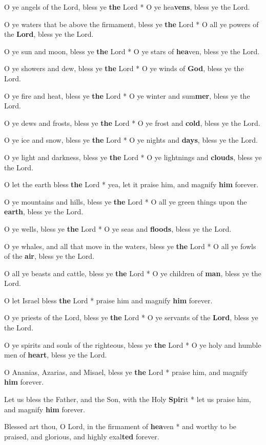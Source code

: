 \begin{multicols}{2}
	O ye angels of the Lord, bless ye \textbf{the} Lord * O ye hea\textbf{vens}, bless ye the Lord.
	
	O ye waters that be above the firmament, bless ye \textbf{the} Lord * O all ye powers of the \textbf{Lord}, bless ye the Lord.
	
	O ye sun and moon, bless ye \textbf{the} Lord * O ye stars of \textbf{hea}ven, bless ye the Lord.
	
	O ye showers and dew, bless ye \textbf{the} Lord * O ye winds of \textbf{God}, bless ye the Lord.
	
	O ye fire and heat, bless ye \textbf{the} Lord * O ye winter and sum\textbf{mer}, bless ye the Lord.
	
	O ye dews and frosts, bless ye \textbf{the} Lord * O ye frost and \textbf{cold}, bless ye the Lord.
	
	O ye ice and snow, bless ye \textbf{the} Lord * O ye nights and \textbf{days}, bless ye the Lord.
	
	O ye light and darkness, bless ye \textbf{the} Lord * O ye lightnings and \textbf{clouds}, bless ye the Lord.
	
	O let the earth bless \textbf{the} Lord * yea, let it praise him, and magnify \textbf{him} forever.
	
	O ye mountains and hills, bless ye \textbf{the} Lord * O all ye green things upon the \textbf{earth}, bless ye the Lord.
	
	O ye wells, bless ye \textbf{the} Lord * O ye seas and \textbf{floods}, bless ye the Lord.
	
	O ye whales, and all that move in the waters, bless ye \textbf{the} Lord * O all ye fowls of the \textbf{air}, bless ye the Lord.
	
	O all ye beasts and cattle, bless ye \textbf{the} Lord * O ye children of \textbf{man}, bless ye the Lord.
	
	O let Israel bless \textbf{the} Lord * praise him and magnify \textbf{him} forever.
	
	O ye priests of the Lord, bless ye \textbf{the} Lord * O ye servants of the \textbf{Lord}, bless ye the Lord.
	
	O ye spirits and souls of the righteous, bless ye \textbf{the} Lord * O ye holy and humble men of \textbf{heart}, bless ye the Lord.
	
	O Ananias, Azarias, and Misael, bless ye \textbf{the} Lord * praise him, and magnify \textbf{him} forever.
	
	Let us bless the Father, and the Son, with the Holy \textbf{Spir}it * let us praise him, and magnify \textbf{him} forever.
	
	Blessed art thou, O Lord, in the firmament of \textbf{hea}ven * and worthy to be praised, and glorious, and highly exal\textbf{ted} forever.
\end{multicols}